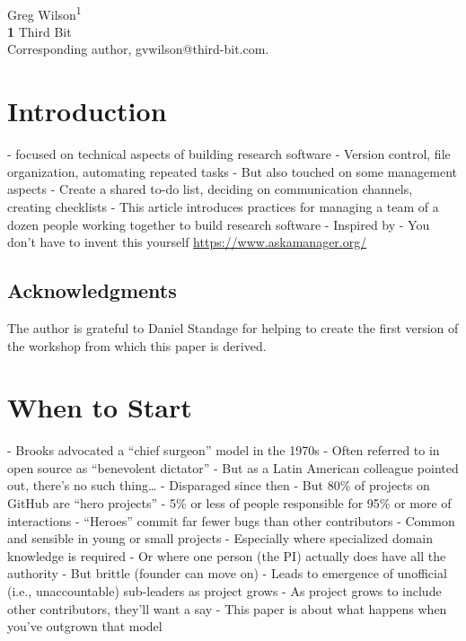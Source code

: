\documentclass[10pt,letterpaper]{article}
\begin{document}
\vspace*{0.2in}

\begin{flushleft}
{\Large
\textbf{}
}
\newline
\\
{Greg Wilson}\textsuperscript{1{\ddag}}
\\
\bigskip
\textbf{1} Third Bit\\
{\ddag} Corresponding author, gvwilson@third-bit.com.
\end{flushleft}

\section*{Introduction}

- \cite{Wilson2014,Wilson2017,Irving2021} focused on technical aspects of building research software
  - Version control, file organization, automating repeated tasks
- But also touched on some management aspects
  - Create a shared to-do list, deciding on communication channels, creating checklists
- This article introduces practices for managing a team of a dozen people working together to build research software
  - Inspired by \cite{Barker2010,ODuinn2021}
- You don't have to invent this yourself \url{https://www.askamanager.org/}

\subsection*{Acknowledgments}

The author is grateful to Daniel Standage for helping to create the first version of
the workshop from which this paper is derived.

\section{When to Start}

- Brooks advocated a ``chief surgeon'' model in the 1970s \cite{Brooks1995}
  - Often referred to in open source as ``benevolent dictator''
  - But as a Latin American colleague pointed out, there's no such thing{\ldots}
- Disparaged since then
  - But 80\% of projects on GitHub are ``hero projects'' \cite{Majumder2019}
  - 5\% or less of people responsible for 95\% or more of interactions
  - ``Heroes'' commit far fewer bugs than other contributors
- Common and sensible in young or small projects
  - Especially where specialized domain knowledge is required
  - Or where one person (the PI) actually does have all the authority
  - But brittle (founder can move on)
  - Leads to emergence of unofficial (i.e., unaccountable) sub-leaders as project grows
  - As project grows to include other contributors, they'll want a say
  - This paper is about what happens when you've outgrown that model
\end{document}
